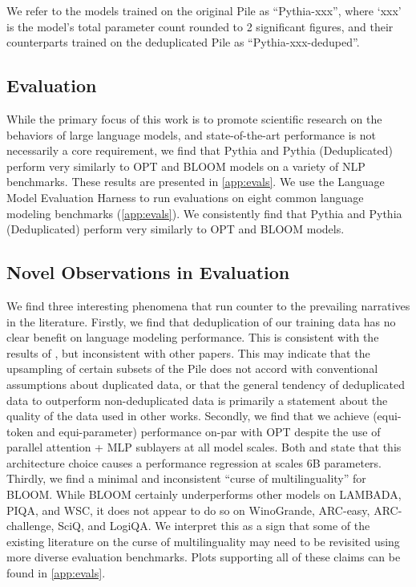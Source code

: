 \documentclass{article}
\theoremstyle{plain}
\theoremstyle{definition}
\theoremstyle{remark}
\begin{document}
We refer to the models trained on the original Pile as ``Pythia-xxx'', where `xxx' is the model's total parameter count rounded to 2 significant figures, and their counterparts trained on the deduplicated Pile as ``Pythia-xxx-deduped''.

\subsection{Evaluation}

While the primary focus of this work is to promote scientific research on the behaviors of large language models, and state-of-the-art performance is not necessarily a core requirement, we find that Pythia and Pythia (Deduplicated) perform very similarly to OPT and BLOOM models on a variety of NLP benchmarks. These results are presented in \cref{app:evals}. We use the Language Model Evaluation Harness \citep{gao2021eval} to run evaluations on eight common language modeling benchmarks (\cref{app:evals}). We consistently find that Pythia and Pythia (Deduplicated) perform very similarly to OPT and BLOOM models.

\subsection{Novel Observations in Evaluation}\label{sec:novel}

We find three interesting phenomena that run counter to the prevailing narratives in the literature. Firstly, we find that deduplication of our training data has no clear benefit on language modeling performance. This is consistent with the results of \citet{black2022gpt}, but inconsistent with other papers. This may indicate that the upsampling of certain subsets of the Pile does not accord with conventional assumptions about duplicated data, or that the general tendency of deduplicated data to outperform non-deduplicated data is primarily a statement about the quality of the data used in other works. Secondly, we find that we achieve (equi-token and equi-parameter) performance on-par with OPT despite the use of parallel attention + MLP sublayers at all model scales. Both \citet{black2022gpt} and \citet{chowdhery2022palm} state that this architecture choice causes a performance regression at scales  6B parameters. Thirdly, we find a minimal and inconsistent ``curse of multilinguality'' \citep{goyal2020unsupervised,pfeiffer2022lifting} for BLOOM. While BLOOM certainly underperforms other models on LAMBADA, PIQA, and WSC, it does not appear to do so on WinoGrande, ARC-easy, ARC-challenge, SciQ, and LogiQA. We interpret this as a sign that some of the existing literature on the curse of multilinguality may need to be revisited using more diverse evaluation benchmarks. Plots supporting all of these claims can be found in \cref{app:evals}.
\end{document}
